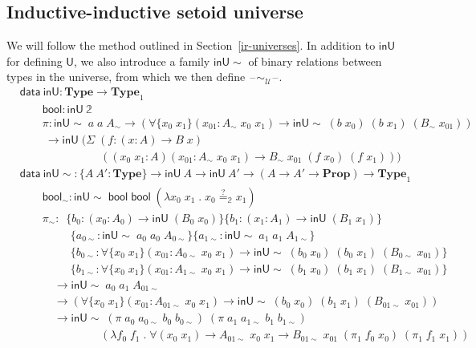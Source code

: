 \documentclass[autoref]{llncs}
\newcommand{\setoidU}{\mathcal{U}}
\newcommand{\inU}{\mathsf{inU}}
\newcommand{\inUU}{\mathsf{inU{\sim}}}
\newcommand{\mType}{\mathbf{Type}}
\newcommand{\mProp}{\mathbf{Prop}}
\newcommand{\U}{\textsf{U}}
\providecommand\mathbbm{\mathbb}
\newcommand{\blank}{\mathord{\hspace{1pt}\text{--}\hspace{1pt}}}
\begin{document}
\subsection{Inductive-inductive setoid universe}\label{ii-universe}

We will follow the method outlined in Section~\ref{ir-universes}. In
addition to $\inU$ for defining $\U$, we also introduce a family
$\inUU$ of binary relations between types in the universe, from which we
then define $\blank\sim_{\setoidU}\blank$.
{\small\vspace{-0.2em}
\begin{align*}
  & \textsf{data}\ \inU : \mType \to \mType_1 \\
  & \qquad \textsf{bool} : \inU\ \mathbbm{2} \\
  & \qquad \pi : \inUU\;a\;a\;A_\sim \to (\forall\{x_0\;x_1\}(x_{01} : A_\sim\;x_0\;x_1)
  \to \inUU\;(b\;x_0)\;(b\;x_1)\;(B_\sim\;x_{01})) \\
  & \qquad\ \to \inU\;
  (\Sigma\;(f : (x : A) \to B\;x) \\
  &\qquad\qquad\qquad\quad\, ((x_0\;x_1 : A)(x_{01} :
    A_\sim\;x_0\;x_1) \to B_\sim\;x_{01}\;(f\;x_0)\;(f\;x_1)))
\end{align*}
\begin{align*}
  & \textsf{data}\ \inUU : \{A\ A' : \mType\} \to \inU\ A \to \inU\ A' \to (A \to A' \to \mProp) \to \mType_1 \\
  & \qquad \mathsf{bool}_\sim : \inUU\;\textsf{bool}\;\textsf{bool}\;
  (\lambda x_0\;x_1\; .\; x_0 \stackrel{?}{=}_{\mathbbm{2}} x_1) \\
  & \qquad \pi_\sim : \ \; \{b_0 : (x_0 : A_0) \to \inU\;(B_0\;x_0)\}
  \{b_1 : (x_1 : A_1) \to \inU\;(B_1\;x_1)\}\\
  & \qquad\quad\quad\ \; \{a_{0\sim} : \inUU\;a_0\;a_0\;A_{0\sim}\}
  \{a_{1\sim} : \inUU\;a_1\;a_1\;A_{1\sim}\} \\
  & \qquad\quad\quad\ \; \{ b_{0\sim} : \forall\{x_0\;x_1\}(x_{01} : A_{0\sim}\;x_0\;x_1)
    \to \inUU\;(b_0\;x_0)\;(b_0\;x_1)\;(B_{0\sim}\;x_{01}) \}\\
  & \qquad\quad\quad\ \; \{ b_{1\sim} : \forall\{x_0\;x_1\}(x_{01} : A_{1\sim}\;x_0\;x_1)
    \to \inUU\;(b_1\;x_0)\;(b_1\;x_1)\;(B_{1\sim}\;x_{01}) \}\\
  & \qquad\quad \to \inUU\;a_0\;a_1\;A_{01\sim} \\
    & \qquad\quad \to (\forall\{x_0\;x_1\}(x_{01} : A_{01\sim}\;x_0\;x_1)
      \to \inUU\;(b_0\;x_0)\;(b_1\;x_1)\;(B_{01\sim}\;x_{01})) \\
  & \qquad\quad \to \inUU\;(\pi\;a_0\;a_{0\sim}\;b_0\;b_{0\sim})\;
      (\pi\;a_1\;a_{1\sim}\;b_1\;b_{1\sim}) \\
  & \qquad\qquad\qquad\quad\,(\lambda f_0\;f_1\;.\;\forall(x_0\;x_1)\to A_{01\sim}\;x_0\;x_1
        \to B_{01\sim}\;x_{01}\;(\pi_1\;f_0\;x_0)\;(\pi_1\;f_1\;x_1))
\end{align*}}\vspace{-1em}
\end{document}
